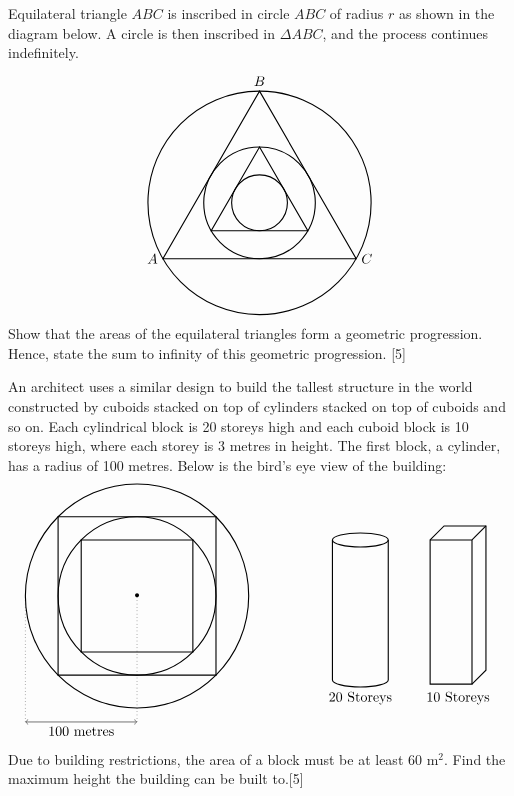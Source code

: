 \documentclass[12pt, a4 paper]{article}
\begin{document}
\begin{outline}[enumerate]
 \1 Equilateral triangle \(ABC\) is inscribed in circle \(ABC\) of radius \(r\) as shown in the diagram below. A circle is then inscribed in \(\Delta ABC\), and the process continues indefinitely. %
 \[
  \begin{tikzpicture}
   \draw[thick] (0,0) circle (80pt);
   \draw[thick] (0,80pt) node[above]{\(B\)} -- (69.282pt,-40pt) node[right]{\(C\)} -- (-69.282pt,-40pt) node[left]{\(A\)} -- cycle;
   \draw[thick] (0,0) circle (40pt);
   \draw[thick] (0,40pt) -- (34.641pt,-20pt) -- (-34.641pt,-20pt) -- cycle;
   \draw[thick] (0,0) circle (20pt);
  \end{tikzpicture}
 \]
 \2 Show that the areas of the equilateral triangles form a geometric progression. Hence, state the sum to infinity of this geometric progression. \hfill[5]

 \2 An architect uses a similar design to build the tallest structure in the world constructed by cuboids stacked on top of cylinders stacked on top of cuboids and so on. Each cylindrical block is 20 storeys high and each cuboid block is 10 storeys high, where each storey is 3 metres in height. The first block, a cylinder, has a radius of 100 metres. Below is the bird's eye view of the building:
 \[
  \begin{tikzpicture}
   \draw[<->] (-80pt,-90pt) -- (-40pt,-90pt)node[below]{100 metres} -- (0,-90pt);
   \draw[dotted] (-80pt,-90pt) -- (-80pt,0);
   \draw[dotted] (0pt,-90pt) -- (0,0);
   \draw[thick] (0,0) circle (80pt);
   \draw[thick] (56.5685pt,56.5685pt) -- (-56.5685pt,56.5685pt) --(-56.5685pt,-56.5685pt) -- (56.5685pt,-56.5685pt) -- cycle;
   \draw[thick] (0,0) circle (56.5685pt);
   \draw[thick] (40pt,40pt) -- (-40pt,40pt) --(-40pt,-40pt) -- (40pt,-40pt) -- cycle;
   \draw[thick] (160pt,40pt) ellipse (20pt and 5pt);
   \draw[thick] (140pt,40pt) -- (140pt,-60pt) arc (180:360:20pt and 5pt) -- (180pt,40pt);
   \draw[thick] (210pt,40pt) rectangle (240pt,-63pt);
   \draw[thick] (210pt,40pt) -- (220pt,50pt) -- (250pt,50pt) -- (250pt,-53pt) -- (240pt,-63pt);
   \draw[thick] (250pt,50pt) -- (240pt,40pt);
   \draw (160pt,-65pt) node[below]{20 Storeys};
   \draw (230pt,-65pt) node[below]{10 Storeys};
   \node at (0,0) {\textbullet};
  \end{tikzpicture}
 \]
 Due to building restrictions, the area of a block must be at least 60 m\(^2\). Find the maximum height the building can be built to.\hfill[5]


\end{outline}
\end{document}
